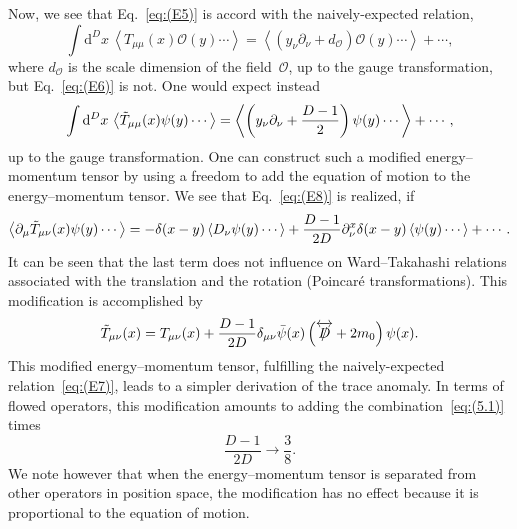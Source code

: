 Now, we see that Eq.~\eqref{eq:(E5)} is accord with the naively-expected
relation,
\begin{equation}
   \int\mathrm{d}^Dx\,\left\langle T_{\mu\mu}(x)
   \mathcal{O}(y)\dotsm\right\rangle
   =\left\langle\left(y_\nu\partial_\nu+d_\mathcal{O}\right)
   \mathcal{O}(y)\dotsm\right\rangle+\dotsb,
\label{eq:(E7)}
\end{equation}
where $d_{\mathcal{O}}$ is the scale dimension of the field~$\mathcal{O}$, up to
the gauge transformation, but Eq.~\eqref{eq:(E6)} is not. One would expect
instead
\begin{equation}
   \int\mathrm{d}^Dx\,\left\langle\Tilde{T}_{\mu\mu}(x)
   \psi(y)\dotsm\right\rangle
   =\left\langle\left(y_\nu\partial_\nu+\frac{D-1}{2}\right)\psi(y)
   \dotsm\right\rangle+\dotsb,
\label{eq:(E8)}
\end{equation}
up to the gauge transformation. One can construct such a modified
energy--momentum tensor by using a freedom to add the equation of motion to
the energy--momentum tensor. We see that Eq.~\eqref{eq:(E8)} is realized, if
\begin{equation}
   \left\langle\partial_\mu\Tilde{T}_{\mu\nu}(x)\psi(y)\dotsm\right\rangle
   =-\delta(x-y)
   \left\langle D_\nu \psi(y)\dotsm\right\rangle
   +\frac{D-1}{2D}\partial_\nu^x\delta(x-y)
   \left\langle\psi(y)\dotsm\right\rangle+\dotsb.
\label{eq:(E9)}
\end{equation}
It can be seen that the last term does not influence on Ward--Takahashi
relations associated with the translation and the rotation (Poincar\'e
transformations). This modification is accomplished by
\begin{equation}
   \Tilde{T}_{\mu\nu}(x)=T_{\mu\nu}(x)
   +\frac{D-1}{2D}
   \delta_{\mu\nu}
   \Bar{\psi}(x)\left(\overleftrightarrow{\Slash{D}}+2m_0\right)\psi(x).
\label{eq:(E10)}
\end{equation}
This modified energy--momentum tensor, fulfilling the naively-expected
relation~\eqref{eq:(E7)}, leads to a simpler derivation of the trace anomaly.
In terms of flowed operators, this modification amounts to adding the
combination~\eqref{eq:(5.1)} times
\begin{equation}
   \frac{D-1}{2D}\to\frac{3}{8}.
\end{equation}
We note however that when the energy--momentum tensor is separated from other
operators in position space, the modification has no effect because it is
proportional to the equation of motion.

